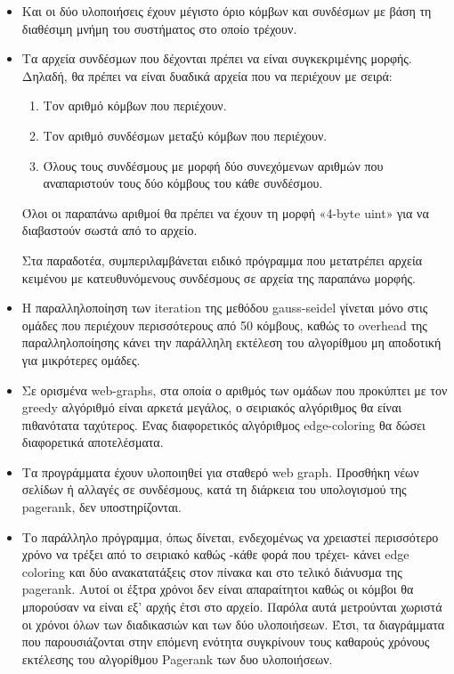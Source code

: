 \begin{itemize}[leftmargin=*]
\item Και οι δύο υλοποιήσεις έχουν μέγιστο όριο κόμβων και συνδέσμων με βάση τη διαθέσιμη μνήμη του συστήματος στο οποίο τρέχουν.
\item Τα αρχεία συνδέσμων που δέχονται πρέπει να είναι συγκεκριμένης μορφής. Δηλαδή, θα πρέπει να είναι δυαδικά αρχεία που να περιέχουν με σειρά:
\begin{enumerate}
\item Τον αριθμό κόμβων που περιέχουν.
\item Τον αριθμό συνδέσμων μεταξύ κόμβων που περιέχουν.
\item Όλους τους συνδέσμους με μορφή δύο συνεχόμενων αριθμών που αναπαριστούν τους δύο κόμβους του κάθε συνδέσμου.
\end{enumerate}

Όλοι οι παραπάνω αριθμοί θα πρέπει να έχουν τη μορφή «4-byte uint» για να διαβαστούν σωστά από το αρχείο.

Στα παραδοτέα, συμπεριλαμβάνεται ειδικό πρόγραμμα που μετατρέπει αρχεία κειμένου με κατευθυνόμενους συνδέσμους σε αρχεία της παραπάνω μορφής.

\item Η παραλληλοποίηση των iteration της μεθόδου gauss-seidel γίνεται μόνο στις ομάδες που περιέχουν περισσότερους από 50 κόμβους, καθώς το overhead της παραλληλοποίησης κάνει την παράλληλη εκτέλεση του αλγορίθμου μη αποδοτική για μικρότερες ομάδες.

\item Σε ορισμένα web-graphs, στα οποία ο αριθμός των ομάδων που προκύπτει με τον greedy αλγόριθμό είναι αρκετά μεγάλος, ο σειριακός αλγόριθμος θα είναι πιθανότατα ταχύτερος. Ένας διαφορετικός αλγόριθμος edge-coloring θα δώσει διαφορετικά αποτελέσματα.

\item Τα προγράμματα έχουν υλοποιηθεί για σταθερό web graph. Προσθήκη νέων σελίδων ή αλλαγές σε συνδέσμους, κατά τη διάρκεια του υπολογισμού της pagerank, δεν υποστηρίζονται.

\item Το παράλληλο πρόγραμμα, όπως δίνεται, ενδεχομένως να χρειαστεί περισσότερο χρόνο να τρέξει από το σειριακό καθώς -κάθε φορά που τρέχει- κάνει edge coloring και δύο ανακατατάξεις στον πίνακα και στο τελικό διάνυσμα της pagerank. Αυτοί οι έξτρα χρόνοι δεν είναι απαραίτητοι καθώς οι κόμβοι θα μπορούσαν να είναι εξ' αρχής έτσι στο αρχείο. Παρόλα αυτά μετρούνται χωριστά οι χρόνοι όλων των διαδικασιών και των δύο υλοποιήσεων. Έτσι, τα διαγράμματα που παρουσιάζονται στην επόμενη ενότητα συγκρίνουν τους καθαρούς χρόνους εκτέλεσης του αλγορίθμου Pagerank των δυο υλοποιήσεων.
\end{itemize}


